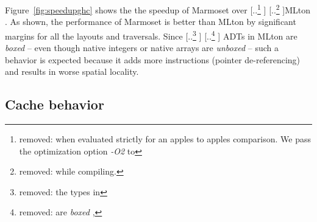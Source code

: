 \documentclass[acmsmall,review,anonymous]{acmart}\settopmatter{printfolios=true,printccs=false,printacmref=false}
\newcommand{\Figref}[1]{Figure~\ref{#1}\xspace}
\newcommand{\system}{{\sc Marmoset}\xspace}
\newcommand{\ghc}{{\sc Ghc}\xspace}
\newcommand{\mlton}{{\sc MLton}\xspace} %
\providecommand{\DIFaddtex}[1]{{\protect\color{blue} \sf #1}} %
\providecommand{\DIFdeltex}[1]{{\protect\color{red} [..\footnote{removed: #1} ]}} %
\providecommand{\DIFaddbegin}{} %
\providecommand{\DIFaddend}{} %
\providecommand{\DIFdelbegin}{} %
\providecommand{\DIFdelend}{} %
\providecommand{\DIFadd}[1]{\texorpdfstring{\DIFaddtex{#1}}{#1}} %
\providecommand{\DIFdel}[1]{\texorpdfstring{\DIFdeltex{#1}}{}} %
\newcommand{\DIFscaledelfig}{0.5}
\newlength{\DIFdelgraphicswidth} %
\newlength{\DIFdelgraphicsheight} %
\newcommand{\DIFaddincludegraphics}[2][]{{\color{blue}\fbox{\DIFOincludegraphics[#1]{#2}}}} %
\newcommand{\DIFdelincludegraphics}[2][]{%
\sbox{\DIFdelgraphicsbox}{\DIFOincludegraphics[#1]{#2}}%
\settoboxwidth{\DIFdelgraphicswidth}{\DIFdelgraphicsbox} %
\settoboxtotalheight{\DIFdelgraphicsheight}{\DIFdelgraphicsbox} %
\scalebox{\DIFscaledelfig}{%
\parbox[b]{\DIFdelgraphicswidth}{\usebox{\DIFdelgraphicsbox}\\[-\baselineskip] \rule{\DIFdelgraphicswidth}{0em}}\llap{\resizebox{\DIFdelgraphicswidth}{\DIFdelgraphicsheight}{%
\setlength{\unitlength}{\DIFdelgraphicswidth}%
\begin{picture}(1,1)%
\thicklines\linethickness{2pt} %
{\color[rgb]{1,0,0}\put(0,0){\framebox(1,1){}}}%
{\color[rgb]{1,0,0}\put(0,0){\line( 1,1){1}}}%
{\color[rgb]{1,0,0}\put(0,1){\line(1,-1){1}}}%
\end{picture}%
}\hspace*{3pt}}} %
} %
\DeclareRobustCommand{\DIFaddbegin}{\DIFOaddbegin \let\includegraphics\DIFaddincludegraphics} %
\DeclareRobustCommand{\DIFaddend}{\DIFOaddend \let\includegraphics\DIFOincludegraphics} %
\DeclareRobustCommand{\DIFdelbegin}{\DIFOdelbegin \let\includegraphics\DIFdelincludegraphics} %
\DeclareRobustCommand{\DIFdelend}{\DIFOaddend \let\includegraphics\DIFOincludegraphics} %
\begin{document}
\Figref{fig:speedupghc} shows the the speedup of \system over \DIFdelbegin %
\DIFdel{when evaluated strictly for an apples to apples comparison.
We pass the optimization option \textit{-O2} to }%
\DIFdel{while compiling. }\DIFdelend \DIFaddbegin \mlton\DIFadd{.
}\DIFaddend As shown, the performance of \system is better than \DIFdelbegin %
\DIFdelend \DIFaddbegin \mlton \DIFaddend by significant margins for all the layouts and traversals.
Since \DIFdelbegin \DIFdel{the types in }%
\DIFdel{are \textit{boxed} , }\DIFdelend \DIFaddbegin \DIFadd{ADTs in }\mlton \DIFadd{are \textit{boxed} -- even though native integers or native arrays are \textit{unboxed} -- }\DIFaddend such a behavior is expected 
because it adds more instructions (pointer de-referencing) and results in worse spatial locality.


\subsection{Cache behavior}\label{subsec:cache}
\end{document}
